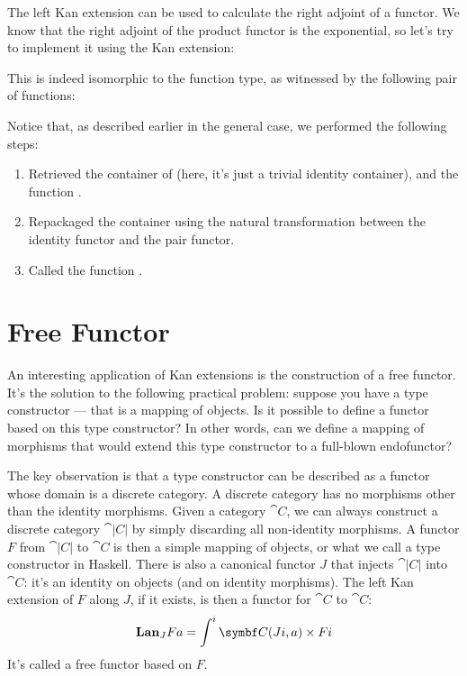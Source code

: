 The left Kan extension can be used to calculate the right adjoint of a
functor. We know that the right adjoint of the product functor is the
exponential, so let's try to implement it using the Kan extension:

This is indeed isomorphic to the function type, as witnessed by the
following pair of functions:

Notice that, as described earlier in the general case, we performed the
following steps:

\begin{enumerate}
  \tightlist
  \item
        Retrieved the container of  (here, it's
        just a trivial identity container), and the function .
  \item
        Repackaged the container using the natural transformation between the
        identity functor and the pair functor.
  \item
        Called the function .
\end{enumerate}

\section{Free Functor}

An interesting application of Kan extensions is the construction of a
free functor. It's the solution to the following practical problem:
suppose you have a type constructor --- that is a mapping of objects. Is
it possible to define a functor based on this type constructor? In other
words, can we define a mapping of morphisms that would extend this type
constructor to a full-blown endofunctor?

The key observation is that a type constructor can be described as a
functor whose domain is a discrete category. A discrete category has no
morphisms other than the identity morphisms. Given a category $\cat{C}$,
we can always construct a discrete category $\cat{|C|}$
by simply discarding all non-identity morphisms. A functor $F$
from $\cat{|C|}$ to $\cat{C}$ is then a simple mapping
of objects, or what we call a type constructor in Haskell. There is also
a canonical functor $J$ that injects $\cat{|C|}$
into $\cat{C}$: it's an identity on objects (and on identity morphisms).
The left Kan extension of $F$ along $J$, if it exists, is
then a functor for $\cat{C}$ to $\cat{C}$:
\[\Lan_{J}F a = \int^i \cat{C}(J i, a)\times{}F i\]
It's called a free functor based on $F$.

